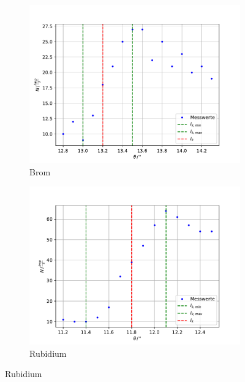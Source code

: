 \begin{figure}[t!]
\medskip
\begin{subfigure}{0.48\textwidth}
\includegraphics[width=\linewidth]{content/data/brom.pdf}
\caption{Brom} \label{fig:brom}
\end{subfigure}\hspace*{\fill}
\begin{subfigure}{0.48\textwidth}
\includegraphics[width=\linewidth]{content/data/rubidium.pdf}
\caption{Rubidium} \label{fig:rubidium}
\end{subfigure}


\end{figure}
